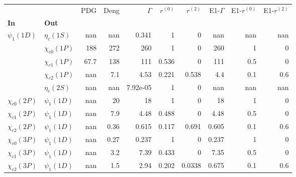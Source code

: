\begin{tabular}{l|l|r|r|r|r|r|r|r|r}
\toprule
                &                &  PDG &  Deng &  $\Gamma$ &  $r^{(0)}$ &  $r^{(2)}$ &  E1-$\Gamma$ &  E1-$r^{(0)}$ &  E1-$r^{(2)}$ \\
\textbf{In} & \textbf{Out} &      &       &           &            &            &              &               &               \\
\midrule
\textbf{$\psi_{1}(1D)$} & \textbf{$\eta_{c}(1S)$} &  nan &   nan &     0.341 &          1 &          0 &          nan &           nan &           nan \\
                & \textbf{$\chi_{c0}(1P)$} &  188 &   272 &       260 &          1 &          0 &          260 &             1 &             0 \\
                & \textbf{$\chi_{c1}(1P)$} & 67.7 &   138 &       111 &      0.536 &          0 &          111 &           0.5 &             0 \\
                & \textbf{$\chi_{c2}(1P)$} &  nan &   7.1 &      4.53 &      0.221 &      0.538 &          4.4 &           0.1 &           0.6 \\
                & \textbf{$\eta_{c}(2S)$} &  nan &   nan &  7.92e-05 &          1 &          0 &          nan &           nan &           nan \\
\textbf{$\chi_{c0}(2P)$} & \textbf{$\psi_{1}(1D)$} &  nan &    20 &        18 &          1 &          0 &           18 &             1 &             0 \\
\textbf{$\chi_{c1}(2P)$} & \textbf{$\psi_{1}(1D)$} &  nan &   7.9 &      4.48 &      0.488 &          0 &         4.48 &           0.5 &             0 \\
\textbf{$\chi_{c2}(2P)$} & \textbf{$\psi_{1}(1D)$} &  nan &  0.36 &     0.615 &      0.117 &      0.691 &        0.605 &           0.1 &           0.6 \\
\textbf{$\chi_{c0}(3P)$} & \textbf{$\psi_{1}(1D)$} &  nan &  0.27 &     0.237 &          1 &          0 &        0.237 &             1 &             0 \\
\textbf{$\chi_{c1}(3P)$} & \textbf{$\psi_{1}(1D)$} &  nan &   3.2 &      7.39 &      0.433 &          0 &         7.35 &           0.5 &             0 \\
\textbf{$\chi_{c2}(3P)$} & \textbf{$\psi_{1}(1D)$} &  nan &   1.5 &      2.94 &      0.202 &     0.0338 &        0.675 &           0.1 &           0.6 \\
\bottomrule
\end{tabular}
